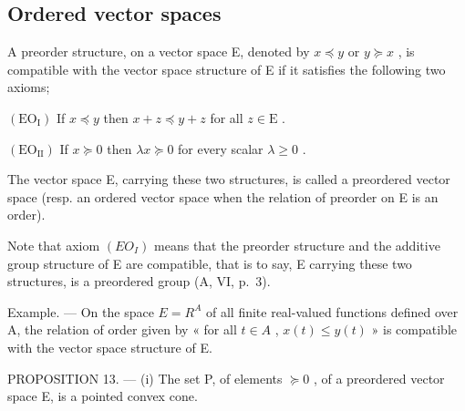 \subsection{Ordered vector spaces}

A preorder structure, on a vector space E, denoted by \(x \preccurlyeq y\) or \(y \succcurlyeq x\) , is compatible with the vector space structure of E if it satisfies the following two axioms;

\((\mathrm{EO}_{\mathrm{I}})\) If \(x \preccurlyeq y\) then \(x + z \preccurlyeq y + z\) for all \(z \in \mathrm{E}\) .

\((\mathrm{EO}_{\mathrm{II}})\) If \(x \succcurlyeq 0\) then \(\lambda x \succcurlyeq 0\) for every scalar \(\lambda \geqslant 0\) .

The vector space E, carrying these two structures, is called a preordered vector space (resp. an ordered vector space when the relation of preorder on E is an order).

Note that axiom \((EO_{I})\) means that the preorder structure and the additive group structure of E are compatible, that is to say, E carrying these two structures, is a preordered group (A, VI, p.~3).

Example. --- On the space \(E = R^{A}\) of all finite real-valued functions defined over A, the relation of order given by « for all \(t \in A\) , \(x(t) \leqslant y(t)\) » is compatible with the vector space structure of E.

PROPOSITION 13. --- (i) The set P, of elements \(\succcurlyeq 0\) , of a preordered vector space E, is a pointed convex cone.

